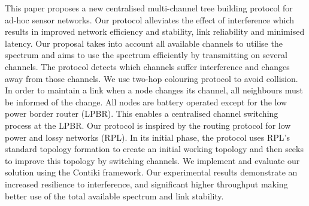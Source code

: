 This paper proposes a new centralised multi-channel tree building protocol for ad-hoc sensor networks. Our protocol alleviates the effect of interference which results in improved network efficiency and stability, link reliability and minimised latency. 
	Our proposal takes into account all available channels to utilise the spectrum and aims to use the spectrum efficiently by transmitting on several channels. The protocol detects which channels suffer interference and changes away from those channels. We use two-hop colouring protocol to avoid collision. 
In order to maintain a link when a node changes its channel, all neighbours must be informed of the change.
	All nodes are battery operated except for the low power border router (LPBR). This enables a centralised channel switching process at the LPBR. Our protocol is inspired by the routing protocol for low power and lossy networks (RPL). In its initial phase, the protocol uses RPL's standard topology formation to create an initial working topology and then seeks to improve this topology by switching channels.
	We implement and evaluate our solution using the Contiki framework. Our experimental results demonstrate an increased resilience to interference, and significant higher throughput making better use of the total available spectrum and link stability. 







